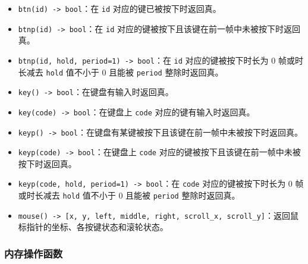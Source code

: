 \documentclass[UTF8]{ctexart}
\begin{document}
\begin{itemize}
    \item \texttt{btn(id) -> bool}：在 \texttt{id} 对应的键已被按下时返回真。
    \item \texttt{btnp(id) -> bool}：在 \texttt{id} 对应的键被按下且该键在前一帧中未被按下时返回真。
    \item \texttt{btnp(id, hold, period=1) -> bool}：在 \texttt{id} 对应的键被按下时长为 0 帧或时长减去 \texttt{hold} 值不小于 0 且能被 \texttt{period} 整除时返回真。
    \item \texttt{key() -> bool}：在键盘有输入时返回真。
    \item \texttt{key(code) -> bool}：在键盘上 \texttt{code} 对应的键有输入时返回真。
    \item \texttt{keyp() -> bool}：在键盘有某键被按下且该键在前一帧中未被按下时返回真。
    \item \texttt{keyp(code) -> bool}：在键盘上 \texttt{code} 对应的键被按下且该键在前一帧中未被按下时返回真。
    \item \texttt{keyp(code, hold, period=1) -> bool}：在 \texttt{code} 对应的键被按下时长为 0 帧或时长减去 \texttt{hold} 值不小于 0 且能被 \texttt{period} 整除时返回真。
    \item \texttt{mouse() -> [x, y, left, middle, right, scroll\_x, scroll\_y]}：返回鼠标指针的坐标、各按键状态和滚轮状态。
\end{itemize}

\subsubsection{内存操作函数}
\end{document}
